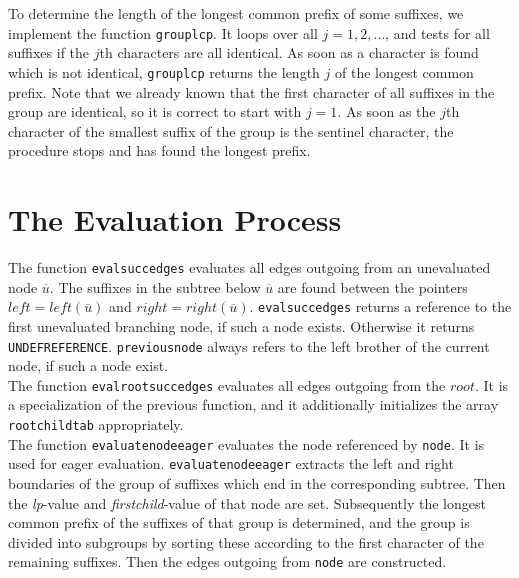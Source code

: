 \documentclass[a4paper]{article}
\begin{document}
To determine the length of the longest common prefix of some suffixes, we
implement the function \texttt{grouplcp}. It loops over all \(j=1,2,\ldots\),
and tests for all suffixes if the \(j\)th characters are all identical. As soon
as a character is found which is not identical, \texttt{grouplcp} returns the
length \(j\) of the longest common prefix. Note that we already known that the
first character of all suffixes in the group are identical, so it is correct to
start with \(j=1\). As soon as the \(j\)th character of the smallest suffix of
the group is the sentinel character, the procedure stops and has found the
longest prefix.

\section{The Evaluation Process}

The function \texttt{evalsuccedges} evaluates all edges outgoing from an
unevaluated node \(\overline{u}\). The suffixes in the subtree below
\(\overline{u}\) are found between the pointers
\(\mathit{left}=\mathit{left}(\overline{u})\) and
\(\mathit{right}=\mathit{right}(\overline{u})\).  \texttt{evalsuccedges}
returns a reference to the first unevaluated branching node, if such a node
exists. Otherwise it returns \texttt{UNDEFREFERENCE}. \texttt{previousnode}
always refers to the left brother of the current node, if such a node exist.\\

The function \texttt{evalrootsuccedges} evaluates all edges outgoing from the
\(root\). It is a specialization of the previous function, and it additionally
initializes the array \texttt{rootchildtab} appropriately.\\

The function \texttt{evaluatenodeeager} evaluates the node referenced by
\texttt{node}. It is used for eager evaluation.  \texttt{evaluatenodeeager}
extracts the left and right boundaries of the group of suffixes which end in
the corresponding subtree. Then the \emph{lp}-value and \emph{firstchild}-value
of that node are set. Subsequently the longest common prefix of the suffixes of
that group is determined, and the group is divided into subgroups by sorting
these according to the first character of the remaining suffixes. Then the
edges outgoing from \texttt{node} are constructed.\\
\end{document}
